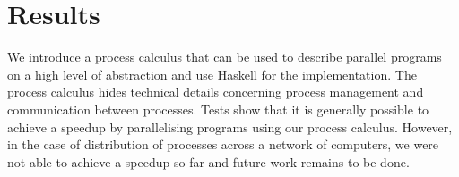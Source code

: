 \section{Results}
We introduce a process calculus that can be used to describe parallel programs on a high level of abstraction and use \textsf{Haskell} for the implementation. The process calculus hides technical details concerning process management and communication between processes. Tests show that it is generally possible to achieve a speedup by parallelising programs using our process calculus. However, in the case of distribution of processes across a network of computers, we were not able to achieve a speedup so far and future work remains to be done.
